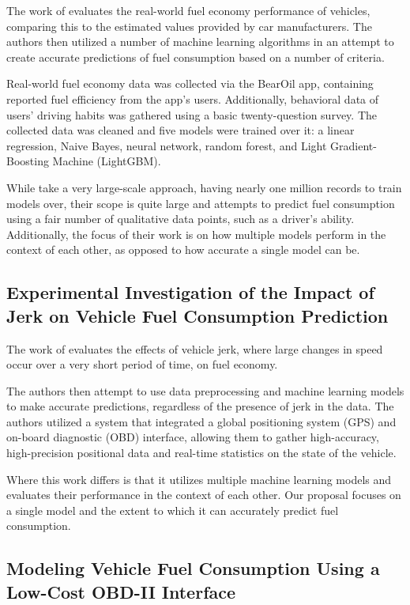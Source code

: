 \documentclass[letterpaper]{article}
\begin{document}
The work of \cite{yang2022predicting} evaluates the real-world fuel economy performance of 
vehicles, comparing this to the estimated values provided by car manufacturers. 
The authors then utilized a number of machine learning algorithms in an attempt to 
create accurate predictions of fuel consumption based on a number of criteria.

Real-world fuel economy data was collected via the BearOil app, containing reported fuel 
efficiency from the app's users. Additionally, behavioral data of users' driving habits was 
gathered using a basic twenty-question survey. The collected data was cleaned and five models 
were trained over it: a linear regression, Naive Bayes, neural network, random forest, 
and Light Gradient-Boosting Machine (LightGBM). 

While \cite{yang2022predicting} take a very large-scale approach, having nearly one million 
records to train models over, their scope is quite large and attempts to predict fuel 
consumption using a fair number of qualitative data points, such as a driver's ability. 
Additionally, the focus of their  work is on how multiple models perform in the context of 
each other, as opposed to how accurate a single model can be.

\subsection*{Experimental Investigation of the Impact of Jerk on Vehicle Fuel
Consumption Prediction}

The work of \cite{zhang2023novel} evaluates the effects of vehicle jerk, where large
changes in speed occur over a very short period of time, on fuel economy. 

The authors then attempt to use data preprocessing and machine learning models to
make accurate predictions, regardless of the presence of jerk in the data. The
authors utilized a system that integrated a global positioning system (GPS) and
on-board diagnostic (OBD) interface, allowing them to gather high-accuracy,
high-precision positional data and real-time statistics on the state of the
vehicle. 

Where this work differs is that it utilizes multiple machine learning models and
evaluates their performance in the context of each other. Our proposal focuses
on a single model and the extent to which it can accurately predict fuel
consumption.

\subsection*{Modeling Vehicle Fuel Consumption Using a Low-Cost OBD-II Interface}
\end{document}
